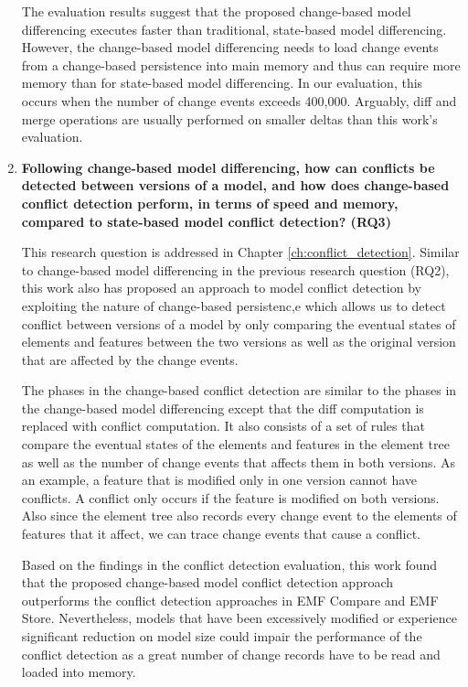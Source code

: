 \begin{enumerate}
 The evaluation results suggest that the proposed change-based model differencing executes faster than traditional, state-based model differencing.
 However, the change-based model differencing needs to load change events from a change-based persistence into main memory and thus can require more memory than for state-based model differencing. In our evaluation, this occurs when the number of change events exceeds 400,000. Arguably, diff and merge operations are usually performed on smaller deltas than this work's evaluation.
  
  \item \textbf{Following change-based model differencing, how can conflicts be detected between versions of a model, and  how does change-based conflict detection perform, in terms of speed and memory, compared to state-based model conflict detection? (RQ3)} 
  
  This research question is addressed in Chapter \ref{ch:conflict_detection}.  Similar to change-based model differencing in the previous research question (RQ2), this work also has proposed an approach to model conflict detection by exploiting the nature of change-based persistenc,e which allows us to detect conflict between versions of a model by only comparing the eventual states of elements and features between the two versions as well as the original version that are affected by the change events.
  
  The phases in the change-based conflict detection are similar to the phases in the change-based model differencing except that the diff computation is replaced with conflict computation. It also consists of a set of rules that compare the eventual states of the elements and features in the element tree as well as the number of change events that affects them in both versions. As an example, a feature that is modified only in one version cannot have conflicts. A conflict only occurs if the feature is modified on both versions. Also since the element tree also records every change event to the elements of features that it affect, we can trace change events that cause a conflict.
  
Based on the findings in the conflict detection evaluation, this work found that the proposed change-based model conflict detection approach outperforms the conflict detection approaches in EMF Compare and EMF Store. Nevertheless, models that have been excessively modified or experience significant reduction on model size could impair the performance of the conflict detection as a great number of change records have to be read and loaded into memory.
  
\end{enumerate}


